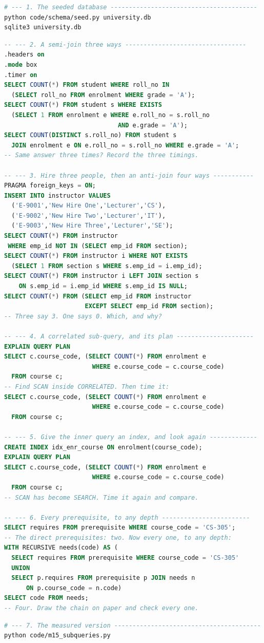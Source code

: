 \begin{lab}
\begin{lstlisting}[language=bash]
# --- 1. The seeded database ----------------------------------------
python code/schema/seed.py university.db
sqlite3 university.db
\end{lstlisting}
\begin{lstlisting}[language=sql]
-- --- 2. A semi-join three ways ---------------------------------
.headers on
.mode box
.timer on
SELECT COUNT(*) FROM student WHERE roll_no IN
  (SELECT roll_no FROM enrolment WHERE grade = 'A');
SELECT COUNT(*) FROM student s WHERE EXISTS
  (SELECT 1 FROM enrolment e WHERE e.roll_no = s.roll_no
                               AND e.grade = 'A');
SELECT COUNT(DISTINCT s.roll_no) FROM student s
  JOIN enrolment e ON e.roll_no = s.roll_no WHERE e.grade = 'A';
-- Same answer three times? Record the three timings.

-- --- 3. Hire three people, then an anti-join four ways -----------
PRAGMA foreign_keys = ON;
INSERT INTO instructor VALUES
  ('E-9001','New Hire One','Lecturer','CS'),
  ('E-9002','New Hire Two','Lecturer','IT'),
  ('E-9003','New Hire Three','Lecturer','SE');
SELECT COUNT(*) FROM instructor
 WHERE emp_id NOT IN (SELECT emp_id FROM section);
SELECT COUNT(*) FROM instructor i WHERE NOT EXISTS
  (SELECT 1 FROM section s WHERE s.emp_id = i.emp_id);
SELECT COUNT(*) FROM instructor i LEFT JOIN section s
    ON s.emp_id = i.emp_id WHERE s.emp_id IS NULL;
SELECT COUNT(*) FROM (SELECT emp_id FROM instructor
                      EXCEPT SELECT emp_id FROM section);
-- Three say 3. One says 0. Which, and why?

-- --- 4. A correlated sub-query, and its plan ---------------------
EXPLAIN QUERY PLAN
SELECT c.course_code, (SELECT COUNT(*) FROM enrolment e
                        WHERE e.course_code = c.course_code)
  FROM course c;
-- Find SCAN inside CORRELATED. Then time it:
SELECT c.course_code, (SELECT COUNT(*) FROM enrolment e
                        WHERE e.course_code = c.course_code)
  FROM course c;

-- --- 5. Give the inner query an index, and look again -------------
CREATE INDEX idx_enr_course ON enrolment(course_code);
EXPLAIN QUERY PLAN
SELECT c.course_code, (SELECT COUNT(*) FROM enrolment e
                        WHERE e.course_code = c.course_code)
  FROM course c;
-- SCAN has become SEARCH. Time it again and compare.

-- --- 6. Every prerequisite, to any depth ------------------------
SELECT requires FROM prerequisite WHERE course_code = 'CS-305';
-- The direct prerequisites: two. Now every one, to any depth:
WITH RECURSIVE needs(code) AS (
  SELECT requires FROM prerequisite WHERE course_code = 'CS-305'
  UNION
  SELECT p.requires FROM prerequisite p JOIN needs n
      ON p.course_code = n.code)
SELECT code FROM needs;
-- Four. Draw the chain on paper and check every one.
\end{lstlisting}
\begin{lstlisting}[language=bash]
# --- 7. The measured version ----------------------------------------
python code/m15_subqueries.py
\end{lstlisting}


\end{lab}
